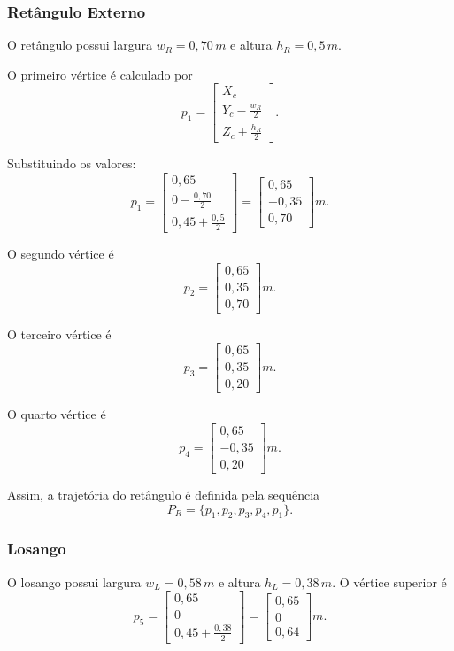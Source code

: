 \subsubsection{Retângulo Externo}

O retângulo possui largura $w_R = 0,70\,m$ e altura $h_R = 0,5\,m$.
\par O primeiro vértice é calculado por
\[
p_1=
\begin{bmatrix}
X_c\\
Y_c-\frac{w_R}{2}\\
Z_c+\frac{h_R}{2}
\end{bmatrix}.
\]

Substituindo os valores:
\[
p_1=
\begin{bmatrix}
0,65\\
0-\frac{0,70}{2}\\
0,45+\frac{0,5}{2}
\end{bmatrix}
=
\begin{bmatrix}
0,65\\
-0,35\\
0,70
\end{bmatrix}
m.
\]

O segundo vértice é
\[
p_2=
\begin{bmatrix}
0,65\\
0,35\\
0,70
\end{bmatrix}
m.
\]

O terceiro vértice é
\[
p_3=
\begin{bmatrix}
0,65\\
0,35\\
0,20
\end{bmatrix}
m.
\]

O quarto vértice é
\[
p_4=
\begin{bmatrix}
0,65\\
-0,35\\
0,20
\end{bmatrix}
m.
\]

Assim, a trajetória do retângulo é definida pela sequência
\[
P_R=
\{p_1,p_2,p_3,p_4,p_1\}.
\]

\subsubsection{Losango}

O losango possui largura $w_L = 0,58\,m$ e altura $h_L=0,38\,m$.
O vértice superior é
\[
p_5=
\begin{bmatrix}
0,65\\
0\\
0,45+\frac{0,38}{2}
\end{bmatrix}
=
\begin{bmatrix}
0,65\\
0\\
0,64
\end{bmatrix}
m.
\]

